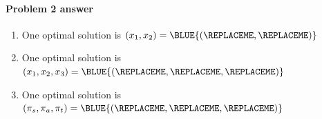 
\paragraph{Problem 2 answer}

\begin{enumerate}[label=(\alph*)]

\item 

  One optimal solution is \(
  (x_1, x_2)=
  \BLUE{
    (\REPLACEME, \REPLACEME) 
  }
  \)
  
\item

  One optimal solution is \(
  (x_1, x_2, x_3) =
  \BLUE{
    (\REPLACEME, \REPLACEME, \REPLACEME)
  }
 \)

\item

  One optimal solution is \(
  (\pi_s, \pi_a, \pi_t) =
  \BLUE{
    (\REPLACEME, \REPLACEME, \REPLACEME)
  }
  \)

\end{enumerate}

\vfill

